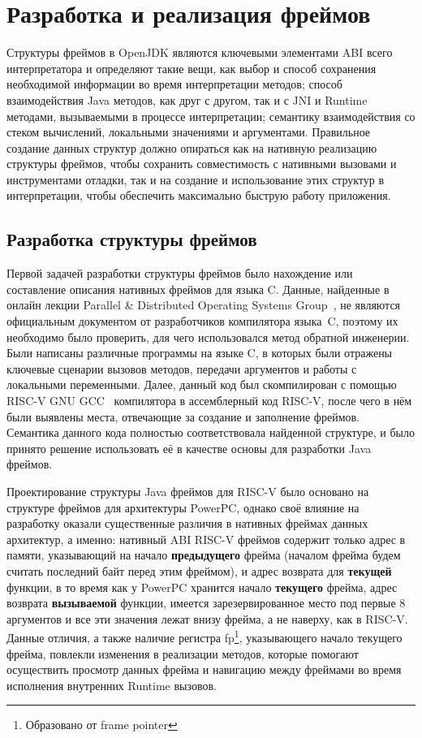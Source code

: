\section{Разработка и реализация фреймов}

Структуры фреймов в OpenJDK являются ключевыми элементами ABI всего интерпретатора и определяют такие вещи, как выбор и способ сохранения необходимой информации во время интерпретации методов; способ взаимодействия Java методов, как друг с другом, так и с JNI и Runtime методами, вызываемыми в процессе интерпретации; семантику взаимодействия со стеком вычислений, локальными значениями и аргументами. Правильное создание данных структур должно опираться как на нативную реализацию структуры фреймов, чтобы сохранить совместимость с нативными вызовами и инструментами отладки, так и на создание и использование этих структур в интерпретации, чтобы обеспечить максимально быструю работу приложения.


\subsection{Разработка структуры фреймов}

Первой задачей разработки структуры фреймов было нахождение или составление описания нативных фреймов для языка C. Данные, найденные в онлайн лекции Parallel \& Distributed Operating Systems Group~\cite{lecture_frames}, не являются официальным документом от разработчиков компилятора языка~C, поэтому их необходимо было проверить, для чего использовался метод обратной инженерии. Были написаны различные программы на языке C, в которых были отражены ключевые сценарии вызовов методов, передачи аргументов и работы с локальными переменными. Далее, данный код был скомпилирован с помощью RISC-V GNU GCC~\cite{riscv:gnu} компилятора в ассемблерный код RISC-V, после чего в нём были выявлены места, отвечающие за создание и заполнение фреймов. Семантика данного кода полностью соответствовала найденной структуре, и было принято решение использовать её в качестве основы для разработки Java фреймов. 

Проектирование структуры Java фреймов для RISC-V было основано на структуре фреймов для архитектуры PowerPC, однако своё влияние на разработку оказали существенные различия в нативных фреймах данных архитектур, а именно: нативный ABI RISC-V фреймов содержит только адрес в памяти, указывающий на начало \textbf{предыдущего} фрейма (началом фрейма будем считать последний байт перед этим фреймом), и адрес возврата для \textbf{текущей} функции, в то время как у PowerPC хранится начало \textbf{текущего} фрейма, адрес возврата \textbf{вызываемой} функции, имеется зарезервированное место под первые 8 аргументов и все эти значения лежат внизу фрейма, а не наверху, как в RISC-V.
Данные отличия, а также наличие регистра fp\footnote{Образовано от frame pointer}, указывающего начало текущего фрейма, повлекли изменения в реализации методов, которые помогают осуществить просмотр данных фрейма и навигацию между фреймами во время исполнения внутренних Runtime вызовов.

